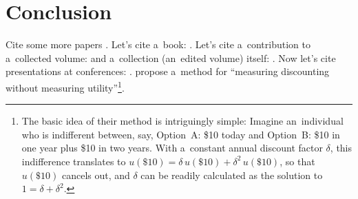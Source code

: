 


\blindmathfalse


\section{Conclusion}
\label{sec:Conclusion}

Cite some more papers \citep{Yaari1965, Warner2001, Davidoff2005, Benartzi2011}. Let's cite a~book: \cite{Luce1959}. Let's cite a~contribution to a~collected volume: \cite{Harrison2008} and a~collection (an~edited volume) itself: \cite{Kagel2016}. Now let's cite presentations at conferences: \cite{Beute2012, Vosgerau2008}. \cite{Attema2016} propose a~method for ``measuring discounting without measuring utility''\footnote{The basic idea of their method is intriguingly simple: Imagine an~individual who is indifferent between, say, Option~A: \$10 today and Option~B: \$10 in one year plus \$10 in two years. With a~constant annual discount factor $\delta$, this indifference translates to $u(\$10) = \delta\,u(\$10) + \delta^2\,u(\$10)$, so that $u(\$10)$ cancels out, and $\delta$ can be readily calculated as the solution to $1 = {\delta + \delta^2}$.}.

\blindtext